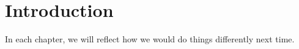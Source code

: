 \chapter*{Introduction}


In each chapter, we will reflect how we would do things differently next time.
